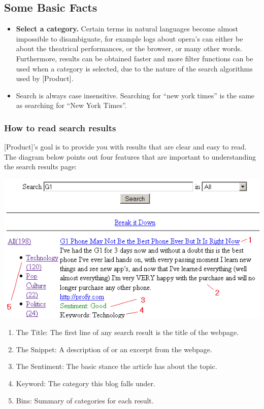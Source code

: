 \documentclass[titlepage]{article}
\begin{document}
\subsection{Some Basic Facts}
\begin{itemize}
\item \textbf{Select a category.} Certain terms in natural languages become
almost impossible to disambiguate, for example logs about opera's can either
be about the theatrical performances, or the browser, or many other words.
Furthermore, results can be obtained faster and more filter functions can be
used when a category is selected, due to the nature of the search algorithms
used by [Product].
\item Search is always case insensitive. Searching for “new york times” is the
same as searching for “New York Times”.
\end{itemize}

\subsubsection{How to read search results}
[Product]'s goal is to provide you with results that are clear and easy to
read. The diagram below points out four features that are important to
understanding the search results page:
\begin{center}
\includegraphics{results.png}
\end{center}

\begin{enumerate}
\item The Title: The first line of any search result is the title of the
webpage.
\item The Snippet: A description of or an excerpt from the webpage.
\item The Sentiment: The basic stance the article has about the topic.
\item Keyword: The category this blog falls under.
\item Bins: Summary of categories for each result.
\end{enumerate}
\end{document}
